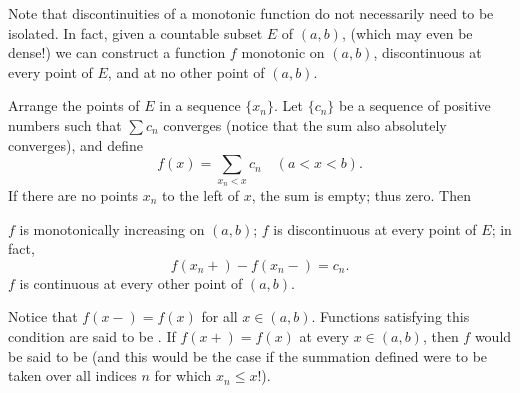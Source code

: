 \documentclass{article}
\begin{document}
Note that discontinuities of a monotonic function do not necessarily need to be isolated. In fact, given a countable subset $E$ of $(a,b)$, (which may even be dense!) we can construct a function $f$ monotonic on $(a,b)$, discontinuous at every point of $E$, and at no other point of $(a,b)$.
\begin{example}[la fonction]
    Arrange the points of $E$ in a sequence $\{x_{n}\}$. Let $\{c_{n}\}$ be a sequence of positive numbers such that $\sum c_{n}$ converges (notice that the sum also absolutely converges), and define \[f(x)=\sum_{x_{n}<x}c_{n}\quad(a<x<b).\]If there are no points $x_{n}$ to the left of $x$, the sum is empty; thus zero. Then 
    \begin{enumerate}
        \ii $f$ is monotonically increasing on $(a,b)$;
        \ii $f$ is discontinuous at every point of $E$; in fact, \[f(x_{n}+)-f(x_{n}-)=c_{n}.\]
        \ii $f$ is continuous at every other point of $(a,b)$.
    \end{enumerate}
    Notice that $f(x-)=f(x)$ for all $x\in(a,b)$. Functions satisfying this condition are said to be . If $f(x+)=f(x)$ at every $x\in(a,b)$, then $f$ would be said to be  (and this would be the case if the summation defined were to be taken over all indices $n$ for which $x_{n}\leq x$!).
\end{example}
\end{document}
